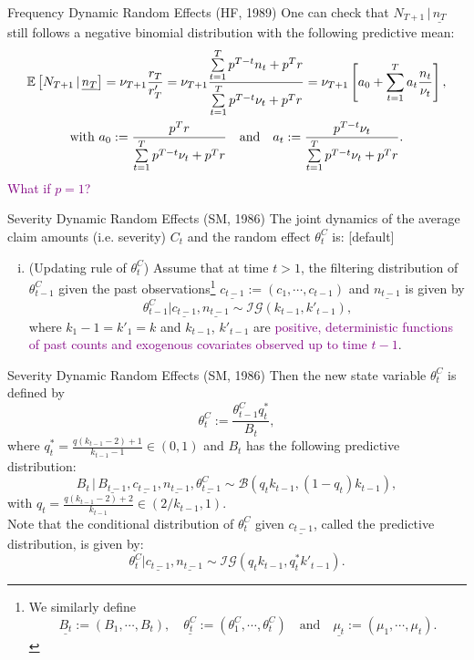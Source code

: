 \documentclass[ignorenonframetext,]{beamer}
\begin{document}
\begin{frame}{Frequency Dynamic Random Effects (HF, 1989)}
One can check that $N_{T+1}\,|\,\underline{n_T}$ still follows a negative binomial distribution with the following predictive mean:
{\small
\begin{equation}\label{p3:freqmean}
\begin{gathered}
{\mathbb E}\left[N_{T+1}\,|\,\underline{n_T}\right] = \nu_{T+1}\frac{r_T}{r'_T}
= \nu_{T+1}\frac{\sum\limits_{t=1}^T p^{T-t}n_t + p^Tr}{\sum\limits_{t=1}^T p^{T-t}\nu_t + p^Tr}
= \nu_{T+1}\left[a_0 + \sum_{t=1}^T a_t \frac{n_t}{\nu_t}\right], \\
\text{with } a_0 := \frac{p^Tr}{\sum\limits_{t=1}^T p^{T-t}\nu_t + p^Tr} \quad \text{and} \quad
a_t := \frac{p^{T-t}\nu_t}{\sum\limits_{t=1}^T p^{T-t}\nu_t + p^Tr}.
\end{gathered}
\end{equation}
}
\pause
\textcolor{purple}{What if $p=1$?}
\end{frame}

\begin{frame}{Severity Dynamic Random Effects (SM, 1986)}
The joint dynamics of the average claim amounts (i.e. severity) $C_t$ and the random effect $\theta^C_t$ is:
[default]
\begin{enumerate}[i.]
\item (Updating rule of $\theta^C_t$) Assume that at time $t>1$, the filtering distribution of $\theta^C_{t-1}$
given the past observations\footnote{We similarly define
$$
\underline{B_t} := (B_1,\cdots,B_t), \quad \underline{\theta^C_t} := (\theta^C_1,\cdots,\theta^C_t) \quad \text{and} \quad \underline{\mu_t} := (\mu_1,\cdots,\mu_t).
$$}
$\underline{c_{t-1}} := (c_1,\cdots,c_{t-1})$ and $\underline{n_{t-1}}$ is given by
$$
\theta^C_{t-1}|\underline{c_{t-1}}, \underline{n_{t-1}} \sim \mathcal{IG}\left(k_{t-1}, k'_{t-1}\right),
$$
where $k_1 - 1 = k'_1 = k$ and $k_{t-1}$, $k'_{t-1}$ are \textcolor{purple}{positive, deterministic functions of past counts and exogenous covariates observed up to time $t-1$}.
\end{enumerate}
\end{frame}

\begin{frame}{Severity Dynamic Random Effects (SM, 1986)}
Then the new state variable $\theta^C_t$ is defined by
$$
\theta^C_t := \frac{\theta^C_{t-1}q^*_t}{B_t},
$$
where $q^*_t = \frac{q(k_{t-1}-2)+1}{k_{t-1}-1} \in (0,1)$ and $B_t$ has the following predictive distribution:
$$
B_t \,|\, \underline{B_{t-1}}, \underline{c_{t-1}}, \underline{n_{t-1}}, \underline{\theta^C_{t-1}} \sim \mathcal{B}\left(q_tk_{t-1}, (1-q_t)k_{t-1}\right),
$$
with $q_t = \frac{q(k_{t-1}-2)+2}{k_{t-1}} \in (2/k_{t-1}, 1)$.\\
Note that the conditional distribution of $\theta^C_t$ given $\underline{c_{t-1}}$, called the predictive distribution, is given by:
\begin{equation}\label{p3:sevpred}
\theta^C_t|\underline{c_{t-1}}, \underline{n_{t-1}} \sim \mathcal{IG}\left(q_tk_{t-1}, q^*_tk'_{t-1}\right).
\end{equation}
\end{frame}
\end{document}
